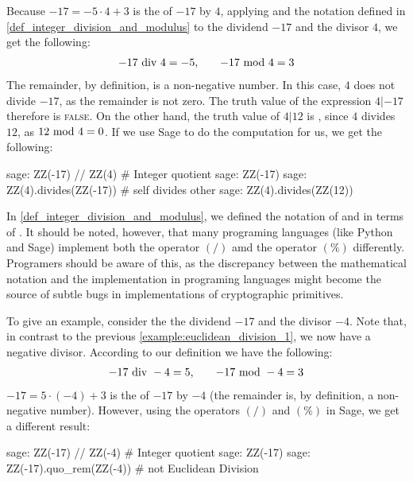 \begin{example}
\label{example:euclidean_division_1}
 Because $ -17 = -5 \cdot 4 + 3 $  is the  of $-17$ by $4$, applying  and the notation defined in \ref{def_integer_division_and_modulus} to the dividend $-17$ and the divisor $4$, we get the following:
\begin{equation}
\begin{array}{lcr}
-17 \text{ div } 4 = - 5, & & -17 \text{ mod } 4 = 3
\end{array}
\end{equation}
The remainder, by definition, is a non-negative number. In this case, $4$ does not divide $-17$, as the remainder is not zero. The truth value of the expression $4 | -17 $ therefore is \textsc{false}. On the other hand, the truth value of $4 | 12$ is , since $4$ divides $12$, as $ 12 \text{ mod } 4 = 0 $. If we use  Sage to do the computation for us, we get the following:
\begin{sagecommandline}
sage: ZZ(-17) // ZZ(4) # Integer quotient
sage: ZZ(-17) %
sage: ZZ(4).divides(ZZ(-17)) # self divides other
sage: ZZ(4).divides(ZZ(12))
\end{sagecommandline}
\end{example}
\begin{remark} In \ref{def_integer_division_and_modulus}, we defined the notation of   and  in terms of . It should be noted, however, that many programing languages (like Python and  Sage) implement both the operator $(/)$ amd the operator $(\%)$ differently. Programers should be aware of this, as the discrepancy between the mathematical notation and the implementation in programing languages might become the source of subtle bugs in implementations of cryptographic primitives.

To give an example, consider the the dividend $-17$ and the divisor $-4$. Note that, in contrast to the previous \examplename{} \ref{example:euclidean_division_1}, we now have a negative divisor. According to our definition we have the following:
\begin{equation}\label{euclidean-negative}
\begin{array}{lcr}
-17 \text{ div } -4 = 5, & & -17 \text{ mod } -4 = 3
\end{array}
\end{equation}
$ -17 = 5 \cdot (-4) + 3 $  is the  of $-17$ by $-4$ (the remainder is, by definition, a non-negative number). However, using the operators $(/)$ and $(\%)$ in  Sage, we get a different result: 

\begin{sagecommandline}
sage: ZZ(-17) // ZZ(-4) # Integer quotient
sage: ZZ(-17) %
sage: ZZ(-17).quo_rem(ZZ(-4)) # not Euclidean Division
\end{sagecommandline}
\end{remark}

